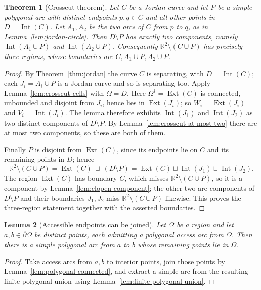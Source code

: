 \documentclass[11pt]{article}
\theoremstyle{mainplain}
\newtheorem{theorem}{Theorem}[section]
\newtheorem{lemma}[theorem]{Lemma}
\theoremstyle{mainroman}
\theoremstyle{definition}
\numberwithin{equation}{section}
\begin{document}
\begin{theorem}[Crosscut theorem]\label{thm:general-crosscut}
Let $C$ be a Jordan curve and let $P$ be a simple polygonal arc with
distinct endpoints $p,q\in C$ and all other points in
$D=\operatorname{Int}(C)$. Let $A_1,A_2$ be the two arcs of $C$ from
$p$ to $q$, as in Lemma~\ref{lem:jordan-circle}. Then $D\setminus P$ has exactly two components, namely
$\operatorname{Int}(A_1\cup P)$ and
$\operatorname{Int}(A_2\cup P)$. Consequently
$\mathbb R^2\setminus(C\cup P)$ has precisely three regions, whose
boundaries are $C,A_1\cup P,A_2\cup P$.
\end{theorem}
\begin{proof}
By Theorem~\ref{thm:jordan} the curve $C$ is separating, with
$D=\operatorname{Int}(C)$; each $J_i=A_i\cup P$ is a Jordan curve and
so is separating too. Apply Lemma~\ref{lem:crosscut-cells} with
$\Omega=D$. Here $\Omega^\dagger=\operatorname{Ext}(C)$ is connected,
unbounded and disjoint from $J_i$, hence lies in
$\operatorname{Ext}(J_i)$; so $W_i=\operatorname{Ext}(J_i)$ and
$V_i=\operatorname{Int}(J_i)$. The lemma therefore exhibits
$\operatorname{Int}(J_1)$ and $\operatorname{Int}(J_2)$ as two distinct
components of $D\setminus P$. By
Lemma~\ref{lem:crosscut-at-most-two} there are at most two components,
so these are both of them.

Finally $P$ is disjoint from $\operatorname{Ext}(C)$, since its
endpoints lie on $C$ and its remaining points in $D$; hence
\[
 \mathbb R^2\setminus(C\cup P)
 =\operatorname{Ext}(C)\ \sqcup\ (D\setminus P)
 =\operatorname{Ext}(C)\sqcup\operatorname{Int}(J_1)
 \sqcup\operatorname{Int}(J_2).
\]
The region $\operatorname{Ext}(C)$ has boundary $C$, which misses
$\mathbb R^2\setminus(C\cup P)$, so it is a component by
Lemma~\ref{lem:clopen-component}; the other two are components of
$D\setminus P$ and their boundaries $J_1,J_2$ miss
$\mathbb R^2\setminus(C\cup P)$ likewise. This proves the three-region
statement together with the asserted boundaries.
\end{proof}

\begin{lemma}[Accessible endpoints can be joined]\label{lem:accessible-endpoints}
Let $\Omega$ be a region and let $a,b\in\partial\Omega$ be distinct
points, each admitting a polygonal access arc from $\Omega$. Then there
is a simple polygonal arc from $a$ to $b$ whose remaining points lie in
$\Omega$.
\end{lemma}
\begin{proof}
Take access arcs from $a,b$ to interior points, join those points by
Lemma~\ref{lem:polygonal-connected}, and extract a simple arc from the
resulting finite polygonal union using
Lemma~\ref{lem:finite-polygonal-union}.
\end{proof}
\end{document}
